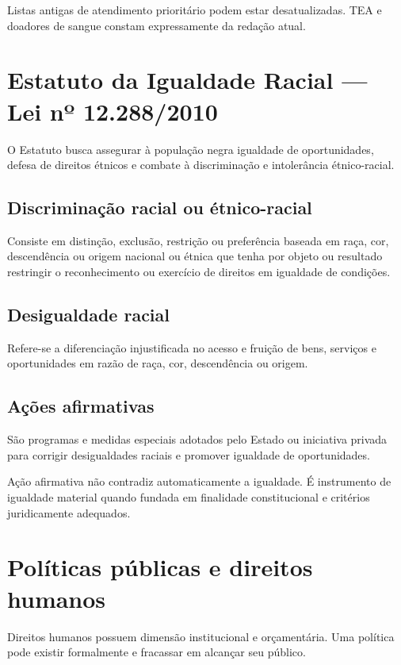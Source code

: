 \begin{atencao}
Listas antigas de atendimento prioritário podem estar desatualizadas. TEA e doadores de sangue constam expressamente da redação atual.
\end{atencao}

\section{Estatuto da Igualdade Racial — Lei nº 12.288/2010}

O Estatuto busca assegurar à população negra igualdade de oportunidades, defesa de direitos étnicos e combate à discriminação e intolerância étnico-racial.

\subsection{Discriminação racial ou étnico-racial}

Consiste em distinção, exclusão, restrição ou preferência baseada em raça, cor, descendência ou origem nacional ou étnica que tenha por objeto ou resultado restringir o reconhecimento ou exercício de direitos em igualdade de condições.

\subsection{Desigualdade racial}

Refere-se a diferenciação injustificada no acesso e fruição de bens, serviços e oportunidades em razão de raça, cor, descendência ou origem.

\subsection{Ações afirmativas}

São programas e medidas especiais adotados pelo Estado ou iniciativa privada para corrigir desigualdades raciais e promover igualdade de oportunidades.

Ação afirmativa não contradiz automaticamente a igualdade. É instrumento de igualdade material quando fundada em finalidade constitucional e critérios juridicamente adequados.

\section{Políticas públicas e direitos humanos}

Direitos humanos possuem dimensão institucional e orçamentária. Uma política pode existir formalmente e fracassar em alcançar seu público.

